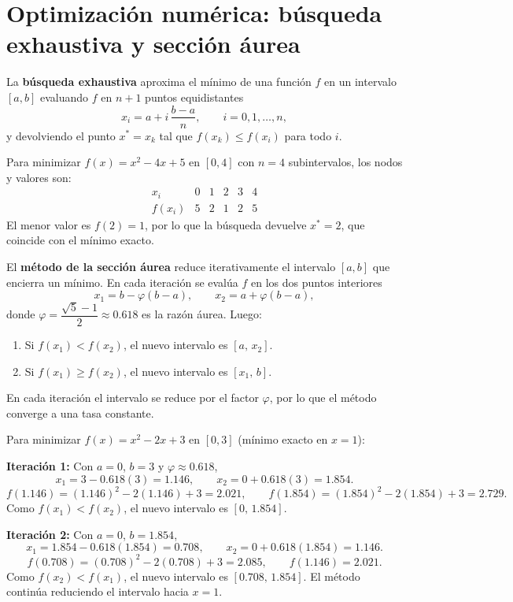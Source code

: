 \documentclass[a4,11pt]{aleph-notas}
\begin{document}
\encabezado

\section{Optimización numérica: búsqueda exhaustiva y sección áurea}

\begin{defi}
    La \textbf{búsqueda exhaustiva} aproxima el mínimo de una función $f$ en un intervalo $[a,b]$ evaluando $f$ en $n+1$ puntos equidistantes
    \[
        x_i = a + i\,\frac{b-a}{n}, \qquad i=0,1,\ldots,n,
    \]
    y devolviendo el punto $x^*=x_k$ tal que $f(x_k)\leq f(x_i)$ para todo $i$.
\end{defi}

\begin{ejem}
    Para minimizar $f(x)=x^2-4x+5$ en $[0,4]$ con $n=4$ subintervalos, los nodos y valores son:
    \[
        \begin{array}{c|ccccc}
            x_i & 0 & 1 & 2 & 3 & 4\\
            \hline
            f(x_i) & 5 & 2 & 1 & 2 & 5
        \end{array}
    \]
    El menor valor es $f(2)=1$, por lo que la búsqueda devuelve $x^*=2$, que coincide con el mínimo exacto.
\end{ejem}

\begin{defi}
    El \textbf{método de la sección áurea} reduce iterativamente el intervalo $[a,b]$ que encierra un mínimo. En cada iteración se evalúa $f$ en los dos puntos interiores
    \[
        x_1 = b-\varphi(b-a),
        \qquad
        x_2 = a+\varphi(b-a),
    \]
    donde $\varphi=\dfrac{\sqrt{5}-1}{2}\approx 0.618$ es la razón áurea. Luego:
    \begin{enumerate}
        \item Si $f(x_1)<f(x_2)$, el nuevo intervalo es $[a,\,x_2]$.
        \item Si $f(x_1)\geq f(x_2)$, el nuevo intervalo es $[x_1,\,b]$.
    \end{enumerate}
    En cada iteración el intervalo se reduce por el factor $\varphi$, por lo que el método converge a una tasa constante.
\end{defi}

\begin{ejem}
    Para minimizar $f(x)=x^2-2x+3$ en $[0,3]$ (mínimo exacto en $x=1$):
    \medskip

    \textbf{Iteración 1:} Con $a=0$, $b=3$ y $\varphi\approx 0.618$,
    \[
        x_1=3-0.618(3)=1.146,\qquad x_2=0+0.618(3)=1.854.
    \]
    \[
        f(1.146)=(1.146)^2-2(1.146)+3=2.021,\qquad f(1.854)=(1.854)^2-2(1.854)+3=2.729.
    \]
    Como $f(x_1)<f(x_2)$, el nuevo intervalo es $[0,\,1.854]$.
    \medskip

    \textbf{Iteración 2:} Con $a=0$, $b=1.854$,
    \[
        x_1=1.854-0.618(1.854)=0.708,\qquad x_2=0+0.618(1.854)=1.146.
    \]
    \[
        f(0.708)=(0.708)^2-2(0.708)+3=2.085,\qquad f(1.146)=2.021.
    \]
    Como $f(x_2)<f(x_1)$, el nuevo intervalo es $[0.708,\,1.854]$. El método continúa reduciendo el intervalo hacia $x=1$.
\end{ejem}
\end{document}

